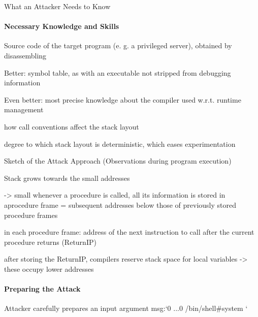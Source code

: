 \documentclass[a4paper]{article}
\begin{document}
\begin{multicols}{3}
    What an Attacker Needs to Know

    \paragraph{Necessary Knowledge and Skills}
    \begin{itemize*}
        \item Source code of the target program (e. g. a privileged server), obtained by disassembling
        \item Better: symbol table, as with an executable not stripped from debugging information
        \item Even better: most precise knowledge about the compiler used w.r.t. runtime management
              \begin{itemize*}
                  \item how call conventions affect the stack layout
                  \item degree to which stack layout is deterministic, which eases experimentation
              \end{itemize*}
    \end{itemize*}

    Sketch of the Attack Approach (Observations during program execution)
    \begin{itemize*}
        \item Stack grows towards the small addresses
              \begin{itemize*}
                  \item ->  small whenever a procedure is called, all its information is stored in aprocedure frame = subsequent addresses below those of previously stored procedure frames
              \end{itemize*}
        \item in each procedure frame: address of the next instruction to call after the current procedure returns (ReturnIP)
        \item after storing the ReturnIP, compilers reserve stack space for local variables ->  these occupy lower addresses
    \end{itemize*}

    \paragraph{Preparing the Attack}
    Attacker carefully prepares an input argument msg:`0 ...0 /bin/shell\#system `


\end{multicols}
\end{document}
